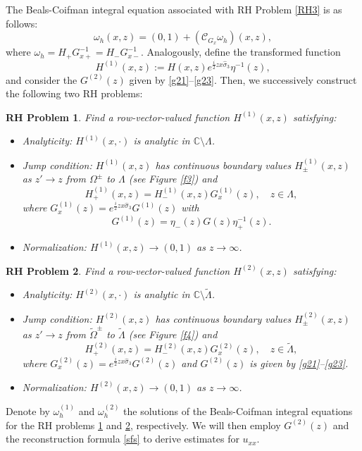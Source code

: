 \documentclass[preprint,compress,12pt]{elsarticle}
\newtheorem{rhp}{RH Problem}
\numberwithin{equation}{section}
\begin{document}
The Beals-Coifman integral equation associated with RH Problem \ref{RH3} is as follows:
\begin{equation}\label{abh}
\omega_{h}(x,z)=(0,1)+\left(\mathcal{C}_{G_{x}}\omega_{h}\right)(x,z),
\end{equation}
where $\omega_{h}=H_{+}G_{x+}^{-1}=H_{-}G_{x-}^{-1}$. Analogously, define the transformed function
\begin{equation}
H^{(1)}(x,z):=H(x,z)e^{\frac{i}{2}zx\widehat{\sigma}_{3}}\eta^{-1}(z),
\end{equation}
and consider the $G^{(2)}(z)$  given by \eqref{g21}--\eqref{g23}. Then, we successively construct the following two RH problems:
\begin{rhp}\label{RHh1}
Find a row-vector-valued function $H^{(1)}(x,z)$ satisfying:
\begin{itemize}
  \item Analyticity: $H^{(1)}(x,\cdot)$ is analytic in $\mathbb{C}\setminus\Lambda$.
  \item Jump condition: $H^{(1)}(x,z)$ has continuous boundary values $H^{(1)}_{\pm}(x,z)$ as $z'\rightarrow z$ from $\Omega^{\pm}$ to $\Lambda$ (see Figure \ref{f3}) and
      \begin{equation}
      H^{(1)}_{+}(x,z)=H^{(1)}_{-}(x,z)G^{(1)}_{x}(z),\quad z\in\Lambda,
      \end{equation}
      where $G^{(1)}_{x}(z)=e^{\frac{i}{2}zx\widehat{\sigma}_{3}}G^{(1)}(z)$ with
      \begin{equation}
      G^{(1)}(z)=\eta_{-}(z)G(z)\eta_{+}^{-1}(z).
      \end{equation}
  \item Normalization: $H^{(1)}(x,z)\rightarrow (0,1)$ as $z\rightarrow\infty$.
\end{itemize}
\end{rhp}
\begin{rhp}\label{RHh2}
Find a row-vector-valued function $H^{(2)}(x,z)$ satisfying:
\begin{itemize}
  \item Analyticity: $H^{(2)}(x,\cdot)$ is analytic in $\mathbb{C}\setminus\widetilde{\Lambda}$.
  \item Jump condition: $H^{(2)}(x,z)$ has continuous boundary values $H^{(2)}_{\pm}(x,z)$ as $z'\rightarrow z$ from $\widetilde{\Omega}^{\pm}$ to $\widetilde{\Lambda}$ (see Figure \ref{f4}) and
      \begin{equation}
      H^{(2)}_{+}(x,z)=H^{(2)}_{-}(x,z)G^{(2)}_{x}(z),\quad z\in\widetilde{\Lambda},
      \end{equation}
      where $G^{(2)}_{x}(z)=e^{\frac{i}{2}zx\widehat{\sigma}_{3}}G^{(2)}(z)$ and $G^{(2)}(z)$  is given by \eqref{g21}--\eqref{g23}.
  \item Normalization: $H^{(2)}(x,z)\rightarrow (0,1)$ as $z\rightarrow\infty$.
\end{itemize}
\end{rhp}
Denote by $\omega_{h}^{(1)}$ and $\omega_{h}^{(2)}$ the solutions of the Beals-Coifman integral equations for the RH problems \ref{RHh1} and \ref{RHh2}, respectively. We will then employ $G^{(2)}(z)$ and the reconstruction formula \eqref{sfs} to derive estimates for $u_{xx}$.
\end{document}
